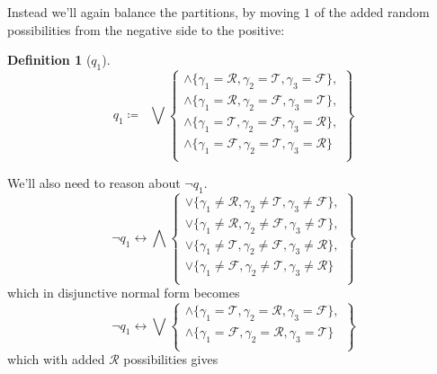 \documentclass[twoside,twocolumn,a4paper,11pt]{article}
\theoremstyle{definition}
\newtheorem{defn}[theorem]{Definition}
\begin{document}
Instead we'll again balance the partitions, by moving $1$ of the added random possibilities from
the negative side to the positive:
\begin{defn}[$q_1$]
\label{def:q1}
\begin{equation}
\label{eq:q1}
q_1\coloneqq\;\;
\bigvee
 \left\lbrace
  \begin{matrix}
   \land\{\gamma_1=\mathcal{R},\gamma_2=\mathcal{T},\gamma_3=\mathcal{F}\},\\
   \land\{\gamma_1=\mathcal{R},\gamma_2=\mathcal{F},\gamma_3=\mathcal{T}\},\\
   \land\{\gamma_1=\mathcal{T},\gamma_2=\mathcal{F},\gamma_3=\mathcal{R}\},\\
   \land\{\gamma_1=\mathcal{F},\gamma_2=\mathcal{T},\gamma_3=\mathcal{R}\}\;\\
  \end{matrix}
 \right\rbrace 
\end{equation}
\end{defn}
We'll also need to reason about $\neg q_1$.
\begin{equation}
\neg q_1 \leftrightarrow
\bigwedge
 \left\lbrace
  \begin{matrix}
   \lor\{\gamma_1\neq\mathcal{R},\gamma_2\neq\mathcal{T},\gamma_3\neq\mathcal{F}\},\\
   \lor\{\gamma_1\neq\mathcal{R},\gamma_2\neq\mathcal{F},\gamma_3\neq\mathcal{T}\},\\
   \lor\{\gamma_1\neq\mathcal{T},\gamma_2\neq\mathcal{F},\gamma_3\neq\mathcal{R}\},\\
   \lor\{\gamma_1\neq\mathcal{F},\gamma_2\neq\mathcal{T},\gamma_3\neq\mathcal{R}\}\;\\
  \end{matrix}
 \right\rbrace 
\end{equation}
which in disjunctive normal form becomes
\begin{equation}
\label{eq:notq1}
\neg q_1 \leftrightarrow
\bigvee
 \left\lbrace
  \begin{matrix}
   \land\{\gamma_1=\mathcal{T},\gamma_2=\mathcal{R},\gamma_3=\mathcal{F}\},\\
   \land\{\gamma_1=\mathcal{F},\gamma_2=\mathcal{R},\gamma_3=\mathcal{T}\}\;\\
  \end{matrix}
 \right\rbrace 
\end{equation}
which with added $\mathcal{R}$ possibilities gives
\end{document}
